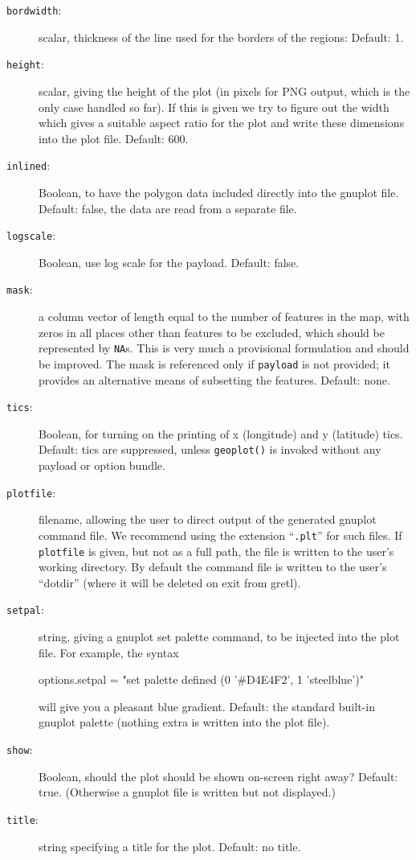 \documentclass{article}
\begin{document}
\begin{description}
\item[\texttt{bordwidth}:] scalar, thickness of the line used for the
  borders of the regions: Default: 1.
\item[\texttt{height}:] scalar, giving the height of the plot (in
  pixels for PNG output, which is the only case handled so far). If
  this is given we try to figure out the width which gives a suitable
  aspect ratio for the plot and write these dimensions into the plot
  file. Default: 600.
\item[\texttt{inlined}:] Boolean, to have the polygon data included
  directly into the gnuplot file. Default: false, the data are read
  from a separate file.
\item[\texttt{logscale}:] Boolean, use log scale for the
  payload. Default: false.
\item[\texttt{mask}:] a column vector of length equal to the number of
  features in the map, with zeros in all places other than features to
  be excluded, which should be represented by \texttt{NA}s. This is
  very much a provisional formulation and should be improved. The mask
  is referenced only if \texttt{payload} is not provided; it provides
  an alternative means of subsetting the features. Default: none.
\item[\texttt{tics}:] Boolean, for turning on the printing of x
  (longitude) and y (latitude) tics. Default: tics are suppressed,
  unless \texttt{geoplot()} is invoked without any payload or option
  bundle.
\item[\texttt{plotfile}:] filename, allowing the user to direct output
  of the generated gnuplot command file. We recommend using the
  extension ``\texttt{.plt}'' for such files. If \texttt{plotfile} is
  given, but not as a full path, the file is written to the user's
  working directory. By default the command file is written to the
  user's ``dotdir'' (where it will be deleted on exit from gretl).
\item[\texttt{setpal}:] string, giving a gnuplot set palette command,
  to be injected into the plot file. For example, the syntax
  \begin{code}
    options.setpal = "set palette defined (0 '#D4E4F2', 1 'steelblue')"  
  \end{code}
  will give you a pleasant blue gradient.  Default: the standard
  built-in gnuplot palette (nothing extra is written into the plot
  file).
\item[\texttt{show}:] Boolean, should the plot should be shown
  on-screen right away? Default: true. (Otherwise a gnuplot file is
  written but not displayed.)
\item[\texttt{title}:] string specifying a title for the
  plot. Default: no title.
\end{description}
\end{document}
